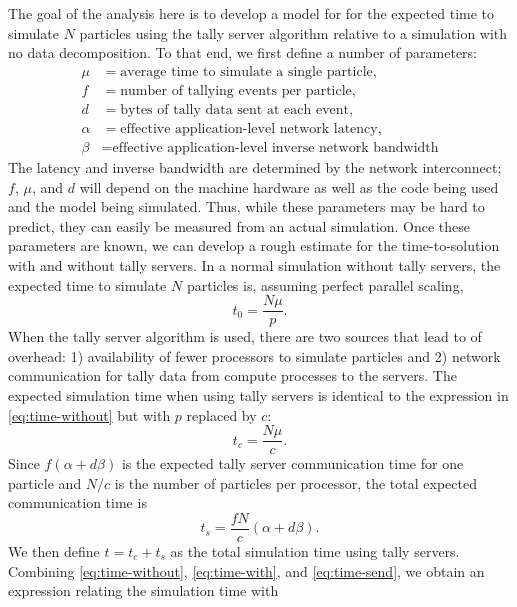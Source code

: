 \documentclass{snamc2013}
\begin{document}
The goal of the analysis here is to develop a model for for the expected time to
simulate $N$ particles using the tally server algorithm relative to a simulation
with no data decomposition. To that end, we first define a number of parameters:
\begin{align*}
  \mu &= \text{average time to simulate a single particle}, \\
  f &= \text{number of tallying events per particle}, \\
  d &= \text{bytes of tally data sent at each event}, \\
  \alpha &= \text{effective application-level network latency}, \\
  \beta &= \text{effective application-level inverse network bandwidth}
\end{align*}
The latency and inverse bandwidth are determined by the network interconnect;
$f$, $\mu$, and $d$ will depend on the machine hardware as well as the code
being used and the model being simulated. Thus, while these parameters may be
hard to predict, they can easily be measured from an actual simulation. Once
these parameters are known, we can develop a rough estimate for the
time-to-solution with and without tally servers. In a normal simulation without
tally servers, the expected time to simulate $N$ particles is, assuming perfect
parallel scaling,
\begin{equation}
  \label{eq:time-without}
  t_0 = \frac{N\mu}{p}.
\end{equation}
When the tally server algorithm is used, there are two sources that lead to of
overhead: 1) availability of fewer processors to simulate particles and 2)
network communication for tally data from compute processes to the servers. The
expected simulation time when using tally servers is identical to the expression
in \autoref{eq:time-without} but with $p$ replaced by $c$:
\begin{equation}
  \label{eq:time-with}
  t_c = \frac{N\mu}{c}.
\end{equation}
Since $f(\alpha + d \beta)$ is the expected tally server communication time for
one particle and $N/c$ is the number of particles per processor, the total
expected communication time is
\begin{equation}
  \label{eq:time-send}
  t_s = \frac{fN}{c} \left ( \alpha + d\beta \right ).
\end{equation}
We then define $t = t_c + t_s$ as the total simulation time using tally
servers. Combining \autoref{eq:time-without}, \autoref{eq:time-with}, and
\autoref{eq:time-send}, we obtain an expression relating the simulation time with
\end{document}
